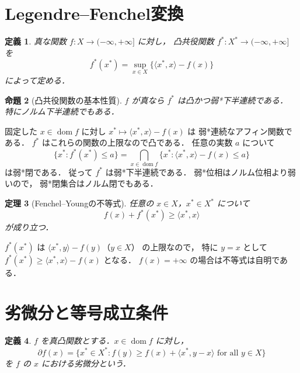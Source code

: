 \documentclass[a5paper,10pt,onecolumn]{jsarticle}
\makeatletter
\theoremstyle{mathnotetheorem}
\newtheorem{theorem}{定理}[section]
\newtheorem{definition}[theorem]{定義}
\newtheorem{proposition}[theorem]{命題}
\renewcommand{\proofname}{証明}
\renewenvironment{proof}[1][\proofname]{%
  \par\pushQED{\qed}\normalfont\topsep4\p@\@plus2\p@\relax
  \trivlist\item[\hskip\labelsep\bfseries #1]\ignorespaces
}{\popQED\endtrivlist\@endpefalse}
\makeatother
\begin{document}
\section{Legendre--Fenchel変換}

\begin{definition}
真な関数 $f:X\to(-\infty,+\infty]$ に対し，
\emph{凸共役関数} $f^*:X^*\to(-\infty,+\infty]$ を
\[
 f^*(x^*)=\sup_{x\in X}
 \{\langle x^*,x\rangle-f(x)\}
\]
によって定める．
\end{definition}

\begin{proposition}[凸共役関数の基本性質]\label{prop:conjugate-basic}
$f$ が真なら $f^*$ は凸かつ弱*下半連続である．
特にノルム下半連続でもある．
\end{proposition}
\begin{proof}
固定した $x\in\operatorname{dom}f$ に対し
$x^*\mapsto\langle x^*,x\rangle-f(x)$ は
弱*連続なアフィン関数である．
$f^*$ はこれらの関数の上限なので凸である．
任意の実数 $a$ について
\[
 \{x^*:f^*(x^*)\le a\}
 =\bigcap_{x\in\operatorname{dom}f}
 \{x^*:\langle x^*,x\rangle-f(x)\le a\}
\]
は弱*閉である．
従って $f^*$ は弱*下半連続である．
弱*位相はノルム位相より弱いので，
弱*閉集合はノルム閉でもある．
\end{proof}

\begin{theorem}[Fenchel--Youngの不等式]\label{thm:fy}
任意の $x\in X$，$x^*\in X^*$ について
\[
 f(x)+f^*(x^*)\ge\langle x^*,x\rangle
\]
が成り立つ．
\end{theorem}
\begin{proof}
$f^*(x^*)$ は
$\langle x^*,y\rangle-f(y)$（$y\in X$）
の上限なので，
特に $y=x$ として
$f^*(x^*)\ge\langle x^*,x\rangle-f(x)$ となる．
$f(x)=+\infty$ の場合は不等式は自明である．
\end{proof}

\section{劣微分と等号成立条件}

\begin{definition}
$f$ を真凸関数とする．$x\in\operatorname{dom}f$ に対し，
\[
 \partial f(x)=
 \{x^*\in X^*:f(y)\ge f(x)+\langle x^*,y-x\rangle
 \text{ for all }y\in X\}
\]
を $f$ の $x$ における\emph{劣微分}という．
\end{definition}
\end{document}
